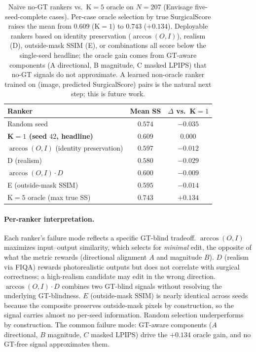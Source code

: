 \documentclass{article}
\begin{document}
\begin{table}[h]
\centering
\small
\caption{Naive no-GT rankers vs.\ K$=5$ oracle on $N{=}207$ (Envisage
five-seed-complete cases). Per-case oracle selection by true SurgicalScore
raises the mean from $0.609$ (K$=1$) to $0.743$ ($+0.134$). Deployable
rankers based on identity preservation ($\arccos(O,I)$), realism (D),
outside-mask SSIM (E), or combinations all score below the single-seed
headline; the oracle gain comes from GT-aware components (A directional,
B magnitude, C masked LPIPS) that no-GT signals do not approximate.
A learned non-oracle ranker trained on (image, predicted SurgicalScore)
pairs is the natural next step; this is future work.}
\label{tab:deployable_ranker}
\begin{tabular}{@{}lcc@{}}
\toprule
\textbf{Ranker} & \textbf{Mean SS} & \textbf{$\Delta$ vs.\ K$=1$} \\
\midrule
Random seed                         & $0.574$ & $-0.035$ \\
\textbf{K$=1$ (seed $42$, headline)} & $\mathbf{0.609}$ & $0.000$ \\
$\arccos(O,I)$ (identity preservation) & $0.597$ & $-0.012$ \\
D (realism)                         & $0.580$ & $-0.029$ \\
$\arccos(O,I) \cdot D$              & $0.600$ & $-0.009$ \\
E (outside-mask SSIM)               & $0.595$ & $-0.014$ \\
\midrule
K$=5$ oracle (max true SS)          & $\mathbf{0.743}$ & $\mathbf{+0.134}$ \\
\bottomrule
\end{tabular}
\end{table}

\paragraph{Per-ranker interpretation.}
Each ranker's failure mode reflects a specific GT-blind tradeoff.
$\arccos(O,I)$ maximizes input--output similarity, which selects for
\emph{minimal} edit, the opposite of what the metric rewards (directional
alignment $A$ and magnitude $B$). $D$ (realism via FIQA) rewards
photorealistic outputs but does not correlate with surgical correctness; a
high-realism candidate may edit in the wrong direction.
$\arccos(O,I) \cdot D$ combines two GT-blind signals without resolving the
underlying GT-blindness. $E$ (outside-mask SSIM) is nearly identical
across seeds because the composite preserves outside-mask pixels by
construction, so the signal carries almost no per-seed information. Random
selection underperforms by construction. The common failure mode: GT-aware
components ($A$ directional, $B$ magnitude, $C$ masked LPIPS) drive the
$+0.134$ oracle gain, and no GT-free signal approximates them.
\end{document}
